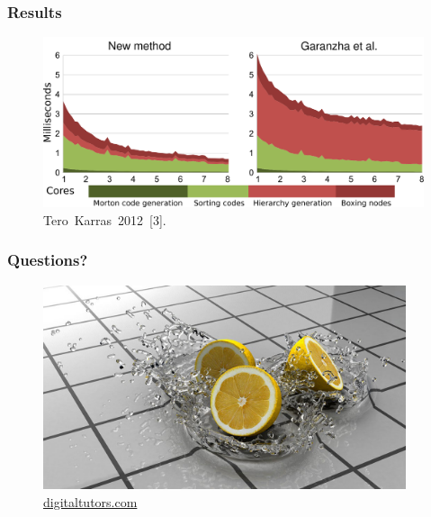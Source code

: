\documentclass{beamer}
\begin{document}
\begin{frame}
  \frametitle{Results}
\begin{figure}
\includegraphics[height=50mm]{new_performance.png}
\hspace{6pt}\hbox{\tiny{Tero Karras 2012 [3].}}
\end{figure}
\end{frame}

%  
%
%

\begin{frame}
  \frametitle{Questions?}
\begin{figure}
\includegraphics[height=60mm]{lemon.jpg}
\hspace{6pt}\hbox{\tiny{\url{digitaltutors.com}}}
\end{figure}
\end{frame}
\end{document}
